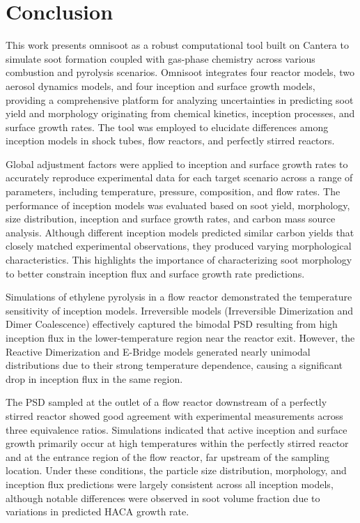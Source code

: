 \section{Conclusion}

This work presents omnisoot as a robust computational tool built on Cantera to simulate soot formation coupled with gas-phase chemistry across various combustion and pyrolysis scenarios. Omnisoot integrates four reactor models, two aerosol dynamics models, and four inception and surface growth models, providing a comprehensive platform for analyzing uncertainties in predicting soot yield and morphology originating from chemical kinetics, inception processes, and surface growth rates. The tool was employed to elucidate differences among inception models in shock tubes, flow reactors, and perfectly stirred reactors.

Global adjustment factors were applied to inception and surface growth rates to accurately reproduce experimental data for each target scenario across a range of parameters, including temperature, pressure, composition, and flow rates. The performance of inception models was evaluated based on soot yield, morphology, size distribution, inception and surface growth rates, and carbon mass source analysis. Although different inception models predicted similar carbon yields that closely matched experimental observations, they produced varying morphological characteristics. This highlights the importance of characterizing soot morphology to better constrain inception flux and surface growth rate predictions.

Simulations of ethylene pyrolysis in a flow reactor demonstrated the temperature sensitivity of inception models. Irreversible models (Irreversible Dimerization and Dimer Coalescence) effectively captured the bimodal PSD resulting from high inception flux in the lower-temperature region near the reactor exit. However, the Reactive Dimerization and E-Bridge models generated nearly unimodal distributions due to their strong temperature dependence, causing a significant drop in inception flux in the same region.

The PSD sampled at the outlet of a flow reactor downstream of a perfectly stirred reactor showed good agreement with experimental measurements across three equivalence ratios. Simulations indicated that active inception and surface growth primarily occur at high temperatures within the perfectly stirred reactor and at the entrance region of the flow reactor, far upstream of the sampling location. Under these conditions, the particle size distribution, morphology, and inception flux predictions were largely consistent across all inception models, although notable differences were observed in soot volume fraction due to variations in predicted HACA growth rate.
